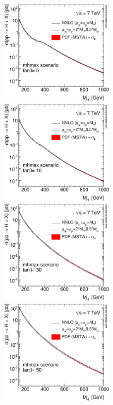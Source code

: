 \begin{figure}[htb]
\includegraphics[width=0.5\textwidth]{YRHXS_MSSM_neutral/YRHXS_MSSM_neutral_fig3a.eps}
\includegraphics[width=0.5\textwidth]{YRHXS_MSSM_neutral/YRHXS_MSSM_neutral_fig3b.eps}
\includegraphics[width=0.5\textwidth]{YRHXS_MSSM_neutral/YRHXS_MSSM_neutral_fig3c.eps}
\includegraphics[width=0.5\textwidth]{YRHXS_MSSM_neutral/YRHXS_MSSM_neutral_fig3d.eps}

\end{figure}
